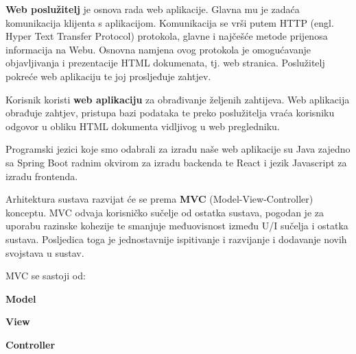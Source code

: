 		\textbf{Web poslužitelj} je osnova rada web aplikacije. Glavna mu je zadaća komunikacija klijenta s aplikacijom. Komunikacija se vrši putem HTTP (engl. Hyper Text Transfer Protocol) protokola,  glavne i najčešće metode prijenosa informacija na Webu.  Osnovna namjena ovog protokola je omogućavanje objavljivanja i prezentacije HTML dokumenata, tj. web stranica. Poslužitelj pokreće web aplikaciju te joj prosljeđuje zahtjev.
		
        Korisnik koristi \textbf{web aplikaciju} za obrađivanje željenih zahtijeva. Web aplikacija obrađuje zahtjev, pristupa bazi podataka te preko poslužitelja vraća korisniku odgovor u obliku HTML dokumenta vidljivog u web pregledniku.
        
        Programski jezici koje smo odabrali za izradu naše web aplikacije su Java zajedno sa Spring Boot radnim okvirom za izradu backenda 
        te React i jezik Javascript za izradu frontenda.
        \newline
        
        Arhitektura sustava razvijat će se prema \textbf{MVC} (Model-View-Controller) konceptu. 
        MVC odvaja korisničko sučelje od ostatka sustava, pogodan je za uporabu razinske kohezije te smanjuje međuovisnost između U/I sučelja i ostatka sustava. Posljedica toga je jednostavnije ispitivanje i razvijanje i dodavanje novih svojstava u sustav.
        \newline
        
        MVC se sastoji od: 
        
        \begin{packed_item}
		\item \textbf{Model}
		\item \textbf{View}
		\item \textbf{Controller}
		\end{packed_item}
		
